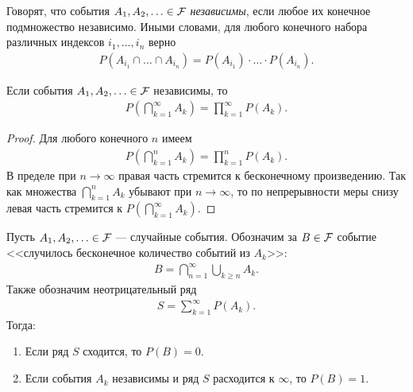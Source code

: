 \documentclass[../main.tex]{subfiles}
\begin{document}
\begin{df}
 Говорят, что события $A_1, A_2, \ldots \in \mathcal F$ \textit{независимы}, если любое их конечное подмножество независимо. Иными словами, для любого конечного набора различных индексов $i_1, \ldots, i_n$ верно
 \begin{align*}
  P(A_{i_1} \cap \ldots \cap A_{i_n}) = P(A_{i_1}) \cdot \ldots \cdot P(A_{i_n}).
 \end{align*} 
\end{df}
\begin{remrk}
 \label{remark:independent_infinite_product}
 Если события $A_1, A_2, \ldots \in \mathcal F$  независимы, то
 \begin{align*}
  P \left( \bigcap_{k=1}^{\infty} A_k \right) = \prod_{k=1}^{\infty} P(A_k).
 \end{align*} 
\end{remrk}
\begin{proof}
 Для любого конечного $n$ имеем
 \begin{align*}
  P \left( \bigcap_{k=1}^{n} A_k \right) = \prod_{k=1}^{n} P(A_k)
 .\end{align*} В пределе при $n \to \infty$ правая часть стремится к бесконечному произведению. Так как множества $ \bigcap_{k=1}^{n}A_k  $ убывают при $ n \to \infty $, то по непрерывности меры снизу левая часть стремится к  $ P( \bigcap_{k=1}^{\infty} A_k)  $.
\end{proof}
\begin{lm}
 Пусть $A_1, A_2, \ldots \in \mathcal F$  --- случайные события. Обозначим за $ B \in \mathcal F$ событие <<случилось бесконечное количество событий из $ A_k $>>:
 \begin{align*}
  B = \bigcap_{n=1}^{\infty} \bigcup_{k \geqslant n} A_k.
 \end{align*} Также обозначим неотрицательный ряд \begin{align*}
  S = \sum_{k=1}^{\infty} P(A_k).
 \end{align*}  Тогда:
 \begin{enumerate}
  \item \label{enum1:lemma:borel_cantelli} Если ряд $ S $ сходится, то $P(B) = 0$.
  \item \label{enum2:lemma:borel_cantelli} Если события $A_k$  независимы и ряд $ S $ расходится к $ \infty $, то $P(B) = 1$.
 \end{enumerate} 
\end{lm}
\end{document}

